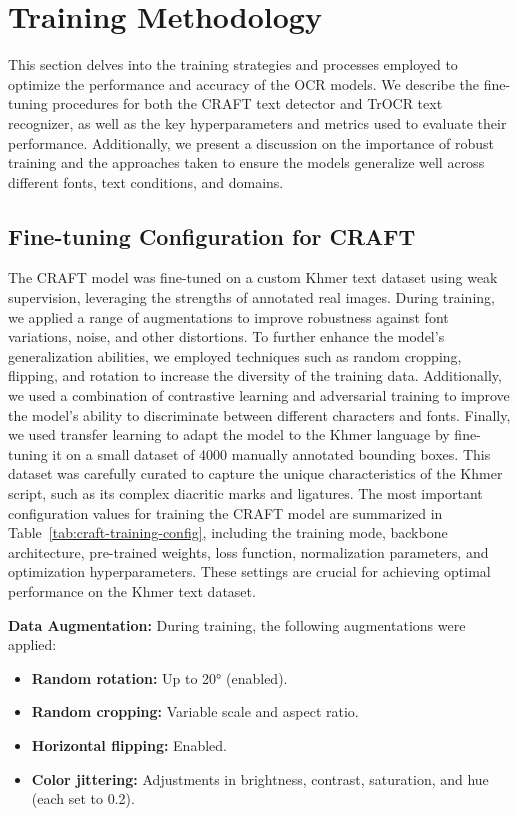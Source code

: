 \section{Training Methodology}
\label{sec:training}
This section delves into the training strategies and processes employed to optimize 
the performance and accuracy of the OCR models. We describe the fine-tuning procedures 
for both the CRAFT text detector and TrOCR text recognizer, as well as the key 
hyperparameters and metrics used to evaluate their performance. Additionally, we 
present a discussion on the importance of robust training and the approaches taken 
to ensure the models generalize well across different fonts, text conditions, and 
domains.



\subsection{Fine-tuning Configuration for CRAFT}
\label{subsec:craft-training}

The CRAFT model was fine-tuned on a custom Khmer text dataset using weak supervision, 
leveraging the strengths of annotated real images. During 
training, we applied a range of augmentations to improve robustness against font 
variations, noise, and other distortions. To further enhance the model's generalization 
abilities, we employed techniques such as random cropping, flipping, and rotation to 
increase the diversity of the training data. Additionally, we used a combination of 
contrastive learning and adversarial training to improve the model's ability to 
discriminate between different characters and fonts. Finally, we used transfer learning 
to adapt the model to the Khmer language by fine-tuning it on a small dataset of 4000 
manually annotated bounding boxes. This dataset was carefully curated to capture the 
unique characteristics of the Khmer script, such as its complex diacritic marks and 
ligatures. The most important configuration values for training the CRAFT model are 
summarized in Table~\ref{tab:craft-training-config}, including the training mode, 
backbone architecture, pre-trained weights, loss function, normalization parameters, 
and optimization hyperparameters. These settings are crucial for achieving optimal 
performance on the Khmer text dataset.

\noindent
\textbf{Data Augmentation:} During training, the following augmentations were applied:
\begin{itemize}
    \item \textbf{Random rotation:} Up to 20° (enabled).
    \item \textbf{Random cropping:} Variable scale and aspect ratio.
    \item \textbf{Horizontal flipping:} Enabled.
    \item \textbf{Color jittering:} Adjustments in brightness, contrast, saturation, and hue (each set to 0.2).
\end{itemize}



